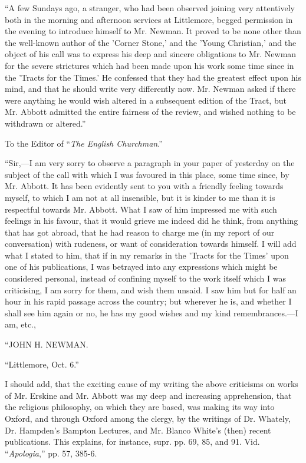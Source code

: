 ``A few Sundays
ago, a stranger, who had been observed joining very attentively both
in the morning and afternoon services at Littlemore, begged permission
in the evening to introduce himself to Mr. Newman. It proved to be
none other than the well-known author of the 'Corner Stone,' and the
'Young Christian,' and the object of his call was to express his deep
and sincere obligations to Mr. Newman for the severe strictures which
had been made upon his work some time since in the 'Tracts for the
Times.' He confessed that they had the greatest effect upon his mind,
and that he should write very differently now. Mr. Newman asked if
there were anything he would wish altered in a subsequent edition of
the Tract, but Mr. Abbott
admitted the entire fairness of the review, and wished nothing to be
withdrawn or altered.''

To
the Editor of ``\emph{The English Churchman}.''

``Sir,—I am
very sorry to observe a paragraph in your paper of yesterday on the
subject of the call with which I was favoured in this place, some time
since, by Mr. Abbott. It has been evidently sent to you with a
friendly feeling towards myself, to which I am not at all insensible,
but it is kinder to me than it is respectful towards Mr. Abbott. What
I saw of him impressed me with such feelings in his favour, that it
would grieve me indeed did he think, from anything that has got
abroad, that he had reason to charge me (in my report of our
conversation) with rudeness, or want of consideration towards himself.
I will add what I stated to him, that if in my remarks in the 'Tracts
for the Times' upon one of his publications, I was betrayed into any
expressions which might be considered personal, instead of confining
myself to the work itself which I was criticising, I am sorry for
them, and wish them unsaid. I saw him but for half an hour in his
rapid passage across the country; but wherever he is, and whether I
shall see him again or no, he has my good wishes and my kind
remembrances.—I am, etc.,

``JOHN
H. NEWMAN.

``Littlemore, Oct. 6.''

I should add, that the exciting cause of my
writing the above criticisms on works of Mr. Erskine and Mr. Abbott
was my deep and increasing apprehension, that the religious
philosophy, on which they are based, was making its way into Oxford,
and through Oxford among the clergy, by the writings of Dr. Whately,
Dr. Hampden's Bampton Lectures, and Mr. Blanco White's (then)
recent publications. This explains, for instance, supr. pp. 69, 85,
and 91. Vid. ``\emph{Apologia},'' pp. 57, 385-6.

